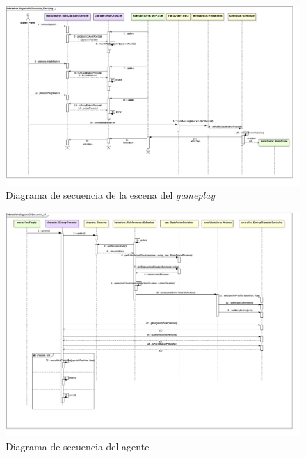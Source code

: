 \begin{figure}
	\centerline{\includegraphics[width=19cm]{otros/UML/png/alld/png/CasosDeUso__Especifico__Collaboration2__Interaction1__diagramaDeSecuencia_Gameplay_18.png}}
	\caption{Diagrama de secuencia de la escena del \textit{gameplay}}
	\label{sec:gameplay}
\end{figure}

\begin{figure}
	\centerline{\includegraphics[width=19cm]{otros/UML/png/alld/png/CasosDeUso__Especifico__Collaboration3__Interaction1__diagramaDeSecuencia_IA_19.png}}
	\caption{Diagrama de secuencia del agente}
	\label{sec:agent}
\end{figure}


